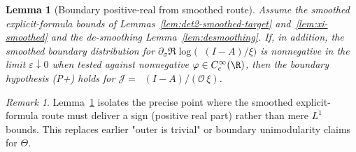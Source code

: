 \documentclass[11pt]{article}
\newtheorem{lemma}[theorem]{Lemma}
\theoremstyle{remark}
\newtheorem{remark}[theorem]{Remark}
\DeclareMathOperator{\dettwo}{det_2}
\begin{document}
\begin{lemma}[Boundary positive-real from smoothed route]\label{lem:boundary-posreal}
Assume the smoothed explicit-formula bounds of Lemmas~\ref{lem:det2-smoothed-target} and~\ref{lem:xi-smoothed} and the de-smoothing Lemma~\ref{lem:desmoothing}. If, in addition, the smoothed boundary distribution for \(\partial_\sigma\Re\log\big(\dettwo(I-A)/\xi\big)\) is nonnegative in the limit \(\varepsilon\downarrow 0\) when tested against nonnegative \(\varphi\in C_c^\infty(\R)\), then the boundary hypothesis \emph{(P+)} holds for \(\mathcal J=\dettwo(I-A)/(\mathcal O\,\xi)\).
\end{lemma}

\begin{remark}
Lemma~\ref{lem:boundary-posreal} isolates the precise point where the smoothed explicit-formula route must deliver a sign (positive real part) rather than mere $L^1$ bounds. This replaces earlier "outer is trivial" or boundary unimodularity claims for \(\Theta\).
\end{remark}
\end{document}
